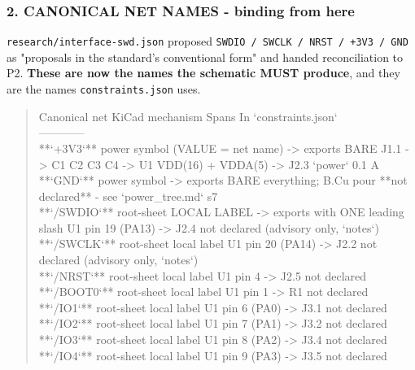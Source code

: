 \documentclass[11pt,a4paper]{article}
\begin{document}
\subsubsection*{2. CANONICAL NET NAMES - binding from here}
\texttt{research/interface-swd.json} proposed \texttt{SWDIO / SWCLK / NRST / +3V3 / GND} as "proposals in the standard's conventional form" and handed reconciliation to P2. \textbf{These are now the names the schematic MUST produce}, and they are the names \texttt{constraints.json} uses.

\begin{quote}\small\ttfamily\raggedright
\textbar{} Canonical net \textbar{} KiCad mechanism \textbar{} Spans \textbar{} In `constraints.json` \textbar{}\\
\textbar{}---\textbar{}---\textbar{}---\textbar{}---\textbar{}\\
\textbar{} {*}{*}`+3V3`{*}{*} \textbar{} power symbol (VALUE = net name) -\textgreater{} exports BARE \textbar{} J1.1 -\textgreater{} C1 C2 C3 C4 -\textgreater{} U1 VDD(16) + VDDA(5) -\textgreater{} J2.3 \textbar{} `power` 0.1 A \textbar{}\\
\textbar{} {*}{*}`GND`{*}{*} \textbar{} power symbol -\textgreater{} exports BARE \textbar{} everything; B.Cu pour \textbar{} {*}{*}not declared{*}{*} - see `power\_tree.md` s7 \textbar{}\\
\textbar{} {*}{*}`/SWDIO`{*}{*} \textbar{} root-sheet LOCAL LABEL -\textgreater{} exports with ONE leading slash \textbar{} U1 pin 19 (PA13) -\textgreater{} J2.4 \textbar{} not declared (advisory only, `notes`) \textbar{}\\
\textbar{} {*}{*}`/SWCLK`{*}{*} \textbar{} root-sheet local label \textbar{} U1 pin 20 (PA14) -\textgreater{} J2.2 \textbar{} not declared (advisory only, `notes`) \textbar{}\\
\textbar{} {*}{*}`/NRST`{*}{*} \textbar{} root-sheet local label \textbar{} U1 pin 4 -\textgreater{} J2.5 \textbar{} not declared \textbar{}\\
\textbar{} {*}{*}`/BOOT0`{*}{*} \textbar{} root-sheet local label \textbar{} U1 pin 1 -\textgreater{} R1 \textbar{} not declared \textbar{}\\
\textbar{} {*}{*}`/IO1`{*}{*} \textbar{} root-sheet local label \textbar{} U1 pin 6 (PA0) -\textgreater{} J3.1 \textbar{} not declared \textbar{}\\
\textbar{} {*}{*}`/IO2`{*}{*} \textbar{} root-sheet local label \textbar{} U1 pin 7 (PA1) -\textgreater{} J3.2 \textbar{} not declared \textbar{}\\
\textbar{} {*}{*}`/IO3`{*}{*} \textbar{} root-sheet local label \textbar{} U1 pin 8 (PA2) -\textgreater{} J3.4 \textbar{} not declared \textbar{}\\
\textbar{} {*}{*}`/IO4`{*}{*} \textbar{} root-sheet local label \textbar{} U1 pin 9 (PA3) -\textgreater{} J3.5 \textbar{} not declared \textbar{}
\end{quote}
\end{document}
